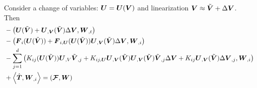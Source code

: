 \documentclass{article}
\begin{document}
Consider a change of variables: $\bfU=\bfU(\bfV)$ and linearization $\bfV\approx\tilde\bfV+\Delta\bfV$.
Then
\begin{align*}
&-\LRp{\bfU(\tilde\bfV)+\bfU_{,\bfV}(\tilde\bfV)\Delta\bfV,\bfW_{,t}}\\
&-\LRp{\bfF_i(\bfU(\tilde\bfV))+\bfF_{i,\bfU}(\bfU(\tilde\bfV))\bfU_{,\bfV}(\tilde\bfV)\Delta\bfV, \bfW_{,i}}\\
&-\sum_{j=1}^d\LRp{K_{ij}(\bfU(\tilde\bfV))\bfU_{,V}\tilde\bfV_{,j}
+K_{ij,\bfU}\bfU_{,\bfV}(\tilde\bfV)\bfU_{,\bfV}(\tilde\bfV)\tilde\bfV_{,j}\Delta\bfV+K_{ij}\bfU_{,\bfV}(\tilde\bfV)\Delta\bfV_{,j},\bfW_{,i}}\\
&+\LRa{\hat{\bfT}, \bfW_{,i}}=\LRp{\bs{\mathcal{F}},\bfW}
\end{align*}
\end{document}

